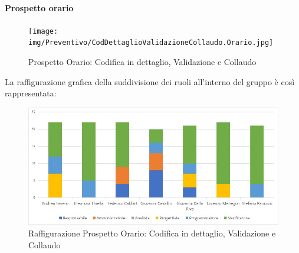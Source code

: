 \paragraph{Prospetto orario}
\begin{figure}[h!]
	\centerline{\texttt{[image: img/Preventivo/CodDettaglioValidazioneCollaudo.Orario.jpg]}}
	\caption{Prospetto Orario: Codifica in dettaglio, Validazione e Collaudo}
\end{figure}
La raffigurazione grafica della suddivisione dei ruoli all'interno del gruppo è così rappresentata: 
\begin{figure}[h!]
	\centerline{\includegraphics[scale=0.4]{img/Preventivo/Istogrammi/CodDettaglioValidazioneCollaudo.jpg}}
	\caption{Raffigurazione Prospetto Orario: Codifica in dettaglio, Validazione e Collaudo}
\end{figure}
